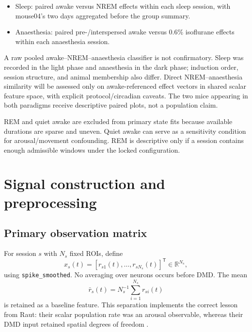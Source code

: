 \documentclass[11pt,a4paper]{article}
\newcommand{\T}{^{\mathsf T}}
\newcommand{\R}{\mathbb{R}}
\begin{document}
\begin{decisionbox}
\begin{itemize}
  \item Sleep: paired awake versus NREM effects within each sleep session, with mouse04's two days aggregated before the group summary.
  \item Anaesthesia: paired pre-/interspersed awake versus 0.6\% isoflurane effects within each anaesthesia session.
\end{itemize}
\end{decisionbox}

A raw pooled awake--NREM--anaesthesia classifier is not confirmatory. Sleep was recorded in the light phase and anaesthesia in the dark phase; induction order, session structure, and animal membership also differ. Direct NREM--anaesthesia similarity will be assessed only on awake-referenced effect vectors in shared scalar feature space, with explicit protocol/circadian caveats. The two mice appearing in both paradigms receive descriptive paired plots, not a population claim.

REM and quiet awake are excluded from primary state fits because available durations are sparse and uneven. Quiet awake can serve as a sensitivity condition for arousal/movement confounding. REM is descriptive only if a session contains enough admissible windows under the locked configuration.

\section{Signal construction and preprocessing}

\subsection{Primary observation matrix}

For session $s$ with $N_s$ fixed ROIs, define
\begin{equation}
  x_s(t)=\left[r_{s1}(t),\ldots,r_{sN_s}(t)\right]\T\in\R^{N_s},
\end{equation}
using \texttt{spike\_smoothed}. No averaging over neurons occurs before DMD. The mean
\begin{equation}
  \bar r_s(t)=N_s^{-1}\sum_{i=1}^{N_s}r_{si}(t)
\end{equation}
is retained as a baseline feature. This separation implements the correct lesson from Raut: their scalar population rate was an arousal observable, whereas their DMD input retained spatial degrees of freedom \citep{raut2025}.
\end{document}

